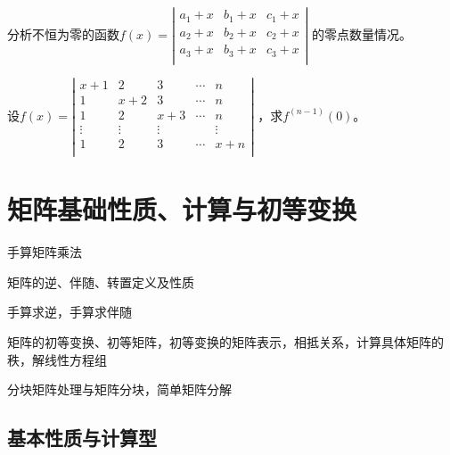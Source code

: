 \documentclass[lang=cn,newtx,10pt,scheme=chinese]{elegantbook}
\begin{document}
\begin{exercise}
    分析不恒为零的函数$f(x)=
    \left|
    \begin{array}{ccc}
        a_1 + x & b_1 + x & c_1 + x \\
        a_2 + x & b_2 + x & c_2 + x \\
        a_3 + x & b_3 + x & c_3 + x \\
    \end{array}
    \right|
    $
    的零点数量情况。
\end{exercise}

\begin{exercise}
    设$f(x)=
    \left|
    \begin{array}{ccccc}
        x + 1   & 2         & 3         & \cdots     & n         \\
        1       & x + 2     & 3         & \cdots     & n         \\
        1       & 2         & x + 3     & \cdots     & n         \\
        \vdots  & \vdots    & \vdots    &            & \vdots    \\
        1       & 2         & 3         & \cdots     & x + n     \\
    \end{array}
    \right|
    $
    ，求$f^{(n-1)}(0)$。
\end{exercise}

\chapter{矩阵基础性质、计算与初等变换}

\begin{introduction}[需要熟悉的知识点]
	\item 手算矩阵乘法
	\item 矩阵的逆、伴随、转置定义及性质
	\item 手算求逆，手算求伴随
	\item 矩阵的初等变换、初等矩阵，初等变换的矩阵表示，相抵关系，计算具体矩阵的秩，解线性方程组
	\item 分块矩阵处理与矩阵分块，简单矩阵分解
\end{introduction}

\section{基本性质与计算型}
\end{document}
